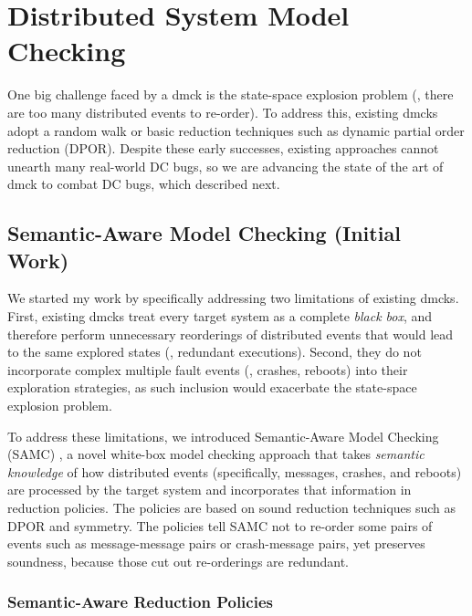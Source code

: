 \section{Distributed System Model Checking}

One big challenge faced by a dmck is the state-space explosion problem (\ie,
there are too many distributed events to re-order). To address this, existing
dmcks adopt a random walk or basic reduction techniques such as dynamic partial
order reduction (DPOR). Despite these early successes, existing approaches
cannot unearth many real-world DC bugs, so we are advancing the state of the art
of dmck to combat DC bugs, which described next.

\subsection{Semantic-Aware Model Checking (Initial Work)}

We started my work by specifically addressing two limitations of existing dmcks.
First, existing dmcks treat every target system as a complete \textit{black
box}, and therefore perform unnecessary reorderings of distributed events that
would lead to the same explored states (\ie, redundant executions). Second, they
do not incorporate complex multiple fault events (\eg, crashes, reboots) into
their exploration strategies, as such inclusion would exacerbate the state-space
explosion problem.

To address these limitations, we introduced Semantic-Aware Model Checking (SAMC)
\cite{Leesatapornwongsa+15-SamcIssta, Leesatapornwongsa+14-Samc}, a novel
white-box model checking approach that takes \textit{semantic knowledge} of how
distributed events (specifically, messages, crashes, and reboots) are processed
by the target system and incorporates that information in reduction policies.
The policies are based on sound reduction techniques such as DPOR and symmetry.
The policies tell SAMC not to re-order some pairs of events such as
message-message pairs or crash-message pairs, yet preserves soundness, because
those cut out re-orderings are redundant.

\subsubsection{Semantic-Aware Reduction Policies}

